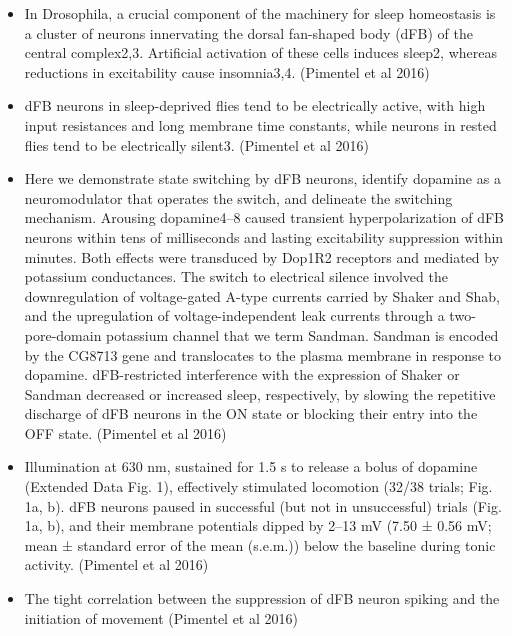 \documentclass[11pt]{article}
\begin{document}
\begin{itemize}
    \item In Drosophila, a crucial component of the machinery for sleep homeostasis is a cluster of neurons innervating the  dorsal fan-shaped body (dFB) of the central complex2,3. Artificial  activation of these cells induces sleep2, whereas reductions in  excitability cause insomnia3,4.
    \cite{pimentelOperationHomeostaticSleep2016} (Pimentel et al 2016)

    \item dFB neurons in sleep-deprived flies tend to be electrically active, with high input resistances and long membrane time constants, while neurons in rested flies tend to be  electrically silent3.
    \cite{pimentelOperationHomeostaticSleep2016} (Pimentel et al 2016)

    \item Here we demonstrate state switching by dFB neurons, identify dopamine as a neuromodulator that operates the switch, and delineate the  switching mechanism. Arousing dopamine4–8 caused transient hyperpolarization of dFB neurons within tens of milliseconds and lasting excitability suppression within minutes. Both effects were transduced by Dop1R2 receptors and mediated by potassium conductances. The switch to electrical silence involved the downregulation of voltage-gated A-type currents carried by Shaker and Shab, and the upregulation of voltage-independent leak currents through a two-pore-domain potassium channel that we term Sandman. Sandman is encoded by the CG8713 gene and translocates to the plasma membrane in response to dopamine. dFB-restricted interference with the expression of Shaker or Sandman decreased or increased sleep, respectively, by slowing the repetitive discharge of dFB neurons in the ON state or blocking their entry into the OFF state.
    \cite{pimentelOperationHomeostaticSleep2016} (Pimentel et al 2016)

    \item Illumination at 630 nm, sustained for 1.5 s to release a bolus of dopamine (Extended Data Fig. 1), effectively stimulated locomotion (32/38 trials; Fig. 1a, b). dFB neurons paused in successful (but not in unsuccessful) trials (Fig. 1a, b), and their membrane potentials dipped by 2–13 mV (7.50 ± 0.56 mV; mean ± standard error of the mean (s.e.m.)) below the baseline during tonic activity.
    \cite{pimentelOperationHomeostaticSleep2016} (Pimentel et al 2016)

    \item The tight correlation between the suppression of dFB neuron spiking and the initiation of movement
    \cite{pimentelOperationHomeostaticSleep2016} (Pimentel et al 2016)


\end{itemize}
\end{document}
